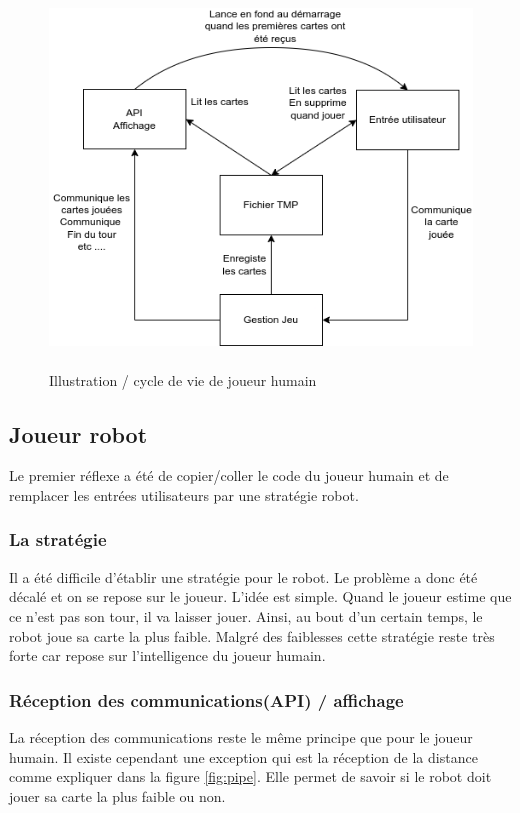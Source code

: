 \documentclass{article}
\begin{document}
\begin{figure}[!htb]
	\centering
    	\includegraphics[height=10cm]{./assets/JoueurHumain.png}
    	\caption{Illustration / cycle de vie de joueur humain}
\end{figure}

\newpage

\subsection{Joueur robot}
Le premier réflexe a été de copier/coller le code du joueur humain et de remplacer les entrées utilisateurs par une stratégie robot. 

\subsubsection{La stratégie}
Il a été difficile d'établir une stratégie pour le robot. Le problème a donc été décalé et on se repose sur le joueur. L'idée est simple. Quand le joueur estime que ce n'est pas son tour, il va laisser jouer. Ainsi, au bout d'un certain temps, le robot joue sa carte la plus faible. Malgré des faiblesses cette stratégie reste très forte car repose sur l'intelligence du joueur humain. 

\subsubsection{Réception des communications(API) / affichage}
La réception des communications reste le même principe que pour le joueur humain. Il existe cependant une exception qui est la réception de la distance comme expliquer dans la figure \ref{fig:pipe}. Elle permet de savoir si le robot doit jouer sa carte la plus faible ou non. 
\end{document}
